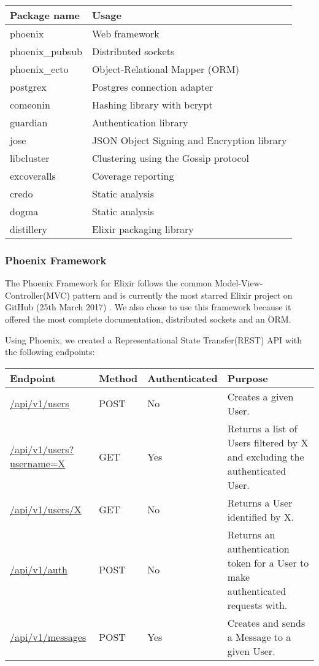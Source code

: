 \documentclass[11pt,a4paper]{report}
\begin{document}
\begin{tabular}{| l | l |}
  \hline
  Package name & Usage \\
  \hline
  phoenix & Web framework \\
  phoenix\_pubsub & Distributed sockets \\
  phoenix\_ecto & Object-Relational Mapper (ORM) \\
  \hline
  postgrex & Postgres connection adapter \\
  comeonin & Hashing library with bcrypt \\
  guardian & Authentication library \\
  jose & JSON Object Signing and Encryption library \\
  libcluster & Clustering using the Gossip protocol \\
  \hline
  excoveralls & Coverage reporting \\
  credo & Static analysis \\
  dogma & Static analysis \\
  distillery & Elixir packaging library \\
  \hline
\end{tabular}

\subsubsection{Phoenix Framework}

The Phoenix Framework for Elixir follows the common Model-View-Controller(MVC) pattern and is currently the most starred Elixir project on GitHub (25th March 2017) \cite{website:github_elixir_trending}. We also chose to use this framework because it offered the most complete documentation, distributed sockets and an ORM.

Using Phoenix, we created a Representational State Transfer(REST) API with the following endpoints:

\begin{center}
\begin{tabular}{| l | l | l | p{4cm} |}
  \hline
  Endpoint & Method & Authenticated & Purpose \\
  \hline
  \url{/api/v1/users} & POST & No & Creates a given User. \\
  \hline
  \url{/api/v1/users?username=X} & GET & Yes & Returns a list of Users filtered by X and excluding the authenticated User. \\
  \hline
  \url{/api/v1/users/X} & GET & No & Returns a User identified by X. \\
  \hline
  \url{/api/v1/auth} & POST & No & Returns an authentication token for a User to make authenticated requests with. \\
  \hline
  \url{/api/v1/messages} & POST & Yes & Creates and sends a Message to a given User. \\
  \hline
\end{tabular}
\end{center}
\end{document}
